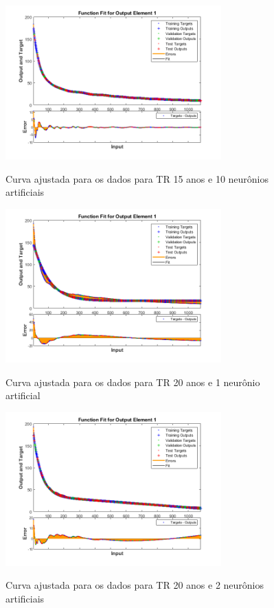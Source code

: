 \begin{figure}[h]
    \caption{Curva ajustada para os dados para TR 15 anos e 10 neurônios artificiais}
    \centering
    \includegraphics[width=0.74\textwidth]{Textuais/Figuras/NN/tr15-10neuronio.png}
    \label{fig:tr15-10n}
\end{figure}

\begin{figure}[h]
    \caption{Curva ajustada para os dados para TR 20 anos e 1 neurônio artificial}
    \centering
    \includegraphics[width=0.74\textwidth]{Textuais/Figuras/NN/tr20-1neuronio.png}
    \label{fig:tr20-1n}
\end{figure}

\begin{figure}[h]
    \caption{Curva ajustada para os dados para TR 20 anos e 2 neurônios artificiais}
    \centering
    \includegraphics[width=0.74\textwidth]{Textuais/Figuras/NN/tr20-2neuronio.png}
    \label{fig:tr20-2n}
\end{figure}

